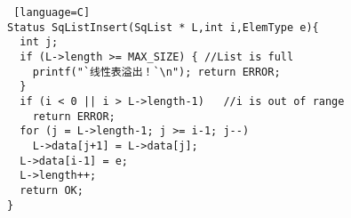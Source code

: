 \begin{lstlisting} [language=C]
Status SqListInsert(SqList * L,int i,ElemType e){
  int j;
  if (L->length >= MAX_SIZE) { //List is full
    printf("`线性表溢出！`\n"); return ERROR;
  }
  if (i < 0 || i > L->length-1)   //i is out of range
    return ERROR;
  for (j = L->length-1; j >= i-1; j--)
    L->data[j+1] = L->data[j];
  L->data[i-1] = e;
  L->length++;
  return OK;
}
\end{lstlisting}
